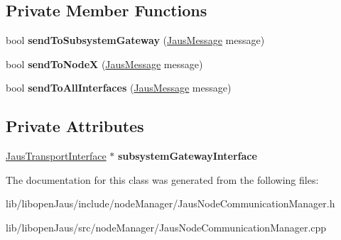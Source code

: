 \subsection*{\-Private \-Member \-Functions}
\begin{DoxyCompactItemize}
\item 
\hypertarget{class_jaus_node_communication_manager_a118c28a2120d3854c82b5a4ce0b349f5}{bool {\bfseries send\-To\-Subsystem\-Gateway} (\hyperlink{struct_jaus_message_struct}{\-Jaus\-Message} message)}\label{class_jaus_node_communication_manager_a118c28a2120d3854c82b5a4ce0b349f5}

\item 
\hypertarget{class_jaus_node_communication_manager_a0cc3c62b3beee7911fa5cc39434fa479}{bool {\bfseries send\-To\-Node\-X} (\hyperlink{struct_jaus_message_struct}{\-Jaus\-Message} message)}\label{class_jaus_node_communication_manager_a0cc3c62b3beee7911fa5cc39434fa479}

\item 
\hypertarget{class_jaus_node_communication_manager_a7276c106d12e423d8bb7272f218da43b}{bool {\bfseries send\-To\-All\-Interfaces} (\hyperlink{struct_jaus_message_struct}{\-Jaus\-Message} message)}\label{class_jaus_node_communication_manager_a7276c106d12e423d8bb7272f218da43b}

\end{DoxyCompactItemize}
\subsection*{\-Private \-Attributes}
\begin{DoxyCompactItemize}
\item 
\hypertarget{class_jaus_node_communication_manager_a5d373323acdecd8af167b537f63cfd6e}{\hyperlink{class_jaus_transport_interface}{\-Jaus\-Transport\-Interface} $\ast$ {\bfseries subsystem\-Gateway\-Interface}}\label{class_jaus_node_communication_manager_a5d373323acdecd8af167b537f63cfd6e}

\end{DoxyCompactItemize}


\-The documentation for this class was generated from the following files\-:\begin{DoxyCompactItemize}
\item 
lib/libopen\-Jaus/include/node\-Manager/\-Jaus\-Node\-Communication\-Manager.\-h\item 
lib/libopen\-Jaus/src/node\-Manager/\-Jaus\-Node\-Communication\-Manager.\-cpp\end{DoxyCompactItemize}
